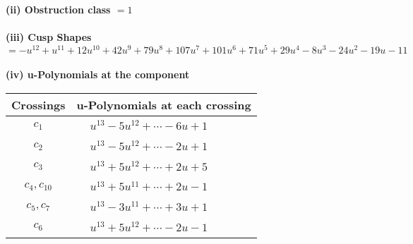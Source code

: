 \documentclass[1p]{elsarticle_modified}
\theoremstyle{definition}
\begin{document}
\flushleft \textbf{(ii) Obstruction class $= 1$}\\~\\
\flushleft \textbf{(iii) Cusp Shapes $= - u^{12}+u^{11}+12 u^{10}+42 u^9+79 u^8+107 u^7+101 u^6+71 u^5+29 u^4-8 u^3-24 u^2-19 u-11$}\\~\\
\newpage\renewcommand{\arraystretch}{1}
\flushleft \textbf{(iv) u-Polynomials at the component}\newline \\
\begin{tabular}{m{50pt}|m{274pt}}
Crossings & \hspace{64pt}u-Polynomials at each crossing \\
\hline $$\begin{aligned}c_{1}\end{aligned}$$&$\begin{aligned}
&u^{13}-5 u^{12}+\cdots-6 u+1
\end{aligned}$\\
\hline $$\begin{aligned}c_{2}\end{aligned}$$&$\begin{aligned}
&u^{13}-5 u^{12}+\cdots-2 u+1
\end{aligned}$\\
\hline $$\begin{aligned}c_{3}\end{aligned}$$&$\begin{aligned}
&u^{13}+5 u^{12}+\cdots+2 u+5
\end{aligned}$\\
\hline $$\begin{aligned}c_{4},c_{10}\end{aligned}$$&$\begin{aligned}
&u^{13}+5 u^{11}+\cdots+2 u-1
\end{aligned}$\\
\hline $$\begin{aligned}c_{5},c_{7}\end{aligned}$$&$\begin{aligned}
&u^{13}-3 u^{11}+\cdots+3 u+1
\end{aligned}$\\
\hline $$\begin{aligned}c_{6}\end{aligned}$$&$\begin{aligned}
&u^{13}+5 u^{12}+\cdots-2 u-1
\end{aligned}$\\

\end{tabular}
\end{document}
